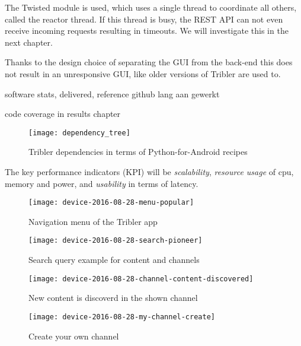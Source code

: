 

The Twisted module is used, which uses a single thread to coordinate all others, called the reactor thread.
If this thread is busy, the REST API can not even receive incoming requests resulting in timeouts.
We will investigate this in the next chapter.

Thanks to the design choice of separating the GUI from the back-end this does not result in an unresponsive GUI, like older versions of Tribler are used to.


software stats, delivered, reference github
lang aan gewerkt

code coverage in results chapter


\begin{figure}[h]
	\centering
	\texttt{[image: dependency\_tree]}
	\caption{Tribler dependencies in terms of Python-for-Android recipes}
	\label{fig:dependency_tree}
\end{figure}


The key performance indicators (KPI) will be \emph{scalability}, \emph{resource usage} of cpu, memory and power, and \emph{usability} in terms of latency.





\begin{figure}[h]
\centering
\texttt{[image: device-2016-08-28-menu-popular]}
\caption{Navigation menu of the Tribler app}
\label{fig:menu-popular}
\end{figure}

\begin{figure}[h]
	\centering
	\texttt{[image: device-2016-08-28-search-pioneer]}
	\caption{Search query example for content and channels}
	\label{fig:search-pioneer}
\end{figure}

\begin{figure}[h]
	\centering
	\texttt{[image: device-2016-08-28-channel-content-discovered]}
	\caption{New content is discoverd in the shown channel}
	\label{fig:channel-content-discovered}
\end{figure}

\begin{figure}[h]
	\centering
	\texttt{[image: device-2016-08-28-my-channel-create]}
	\caption{Create your own channel}
	\label{fig:my-channel-create}
\end{figure}

